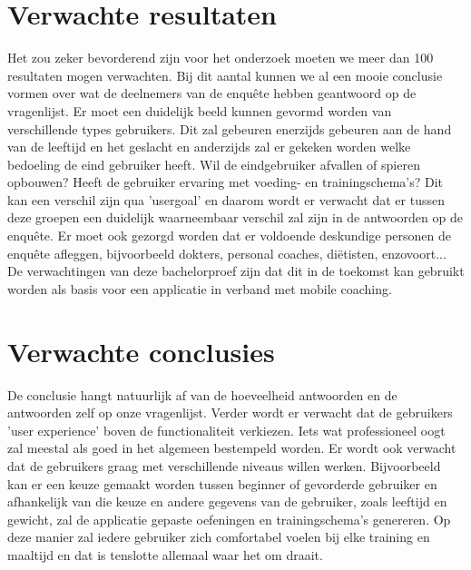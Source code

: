 \section{Verwachte resultaten}
\label{sec:verwachte_resultaten}
Het zou zeker bevorderend zijn voor het onderzoek moeten we meer dan 100 resultaten mogen verwachten. Bij dit aantal kunnen we al een mooie conclusie vormen over wat de deelnemers van de enquête hebben geantwoord op de vragenlijst. \hfill \break \break
Er moet een duidelijk beeld kunnen gevormd worden van verschillende types gebruikers. Dit zal gebeuren enerzijds gebeuren aan de hand van de leeftijd en het geslacht en anderzijds zal er gekeken worden welke bedoeling de eind gebruiker heeft. Wil de eindgebruiker afvallen of spieren opbouwen? Heeft de gebruiker ervaring met voeding- en trainingschema's? Dit kan een verschil zijn qua 'usergoal' en daarom wordt er verwacht dat er tussen deze groepen een duidelijk waarneembaar verschil zal zijn in de antwoorden op de enquête. Er moet ook gezorgd worden dat er voldoende deskundige personen de enquête afleggen, bijvoorbeeld dokters, personal coaches, diëtisten, enzovoort...\hfill \break \break
De verwachtingen van deze bachelorproef zijn dat dit in de toekomst kan gebruikt worden als basis voor een applicatie in verband met mobile coaching. 

\section{Verwachte conclusies}
\label{sec:verwachte_conclusies}
De conclusie hangt natuurlijk af van de hoeveelheid antwoorden en de antwoorden zelf op onze vragenlijst. Verder wordt er verwacht dat de gebruikers 'user experience' boven de functionaliteit verkiezen. Iets wat professioneel oogt zal meestal als goed in het algemeen bestempeld worden. Er wordt ook verwacht dat de gebruikers graag met verschillende niveaus willen werken. Bijvoorbeeld kan er een keuze gemaakt worden tussen beginner of gevorderde gebruiker en afhankelijk van die keuze en andere gegevens van de gebruiker, zoals leeftijd en gewicht, zal de applicatie gepaste oefeningen en trainingschema's genereren. Op deze manier zal iedere gebruiker zich comfortabel voelen bij elke training en maaltijd en dat is tenslotte allemaal waar het om draait.

